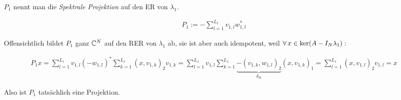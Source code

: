 \begin{remark}
    
    $P_1$ nennt man die \textit{Spektrale Projektion} auf den ER von $\lambda_1$.

    \begin{align*}
        P_1
        :=
        -\sum_{l=1}^{L_1}
            v_{1, l} w_{1, l}^\ast
    \end{align*}

    Offensichtlich bildet $P_1$ ganz $\mathbb{C}^N$ auf den RER von $\lambda_1$ ab, sie ist aber auch idempotent, weil $\forall \, x \in \operatorname{ker}(A - I_N \lambda_1):$

    \begin{align*}
        P_1 x
        =
        \sum_{l=1}^{L_1}
            v_{1, l}
            (-w_{1, l})^\ast
            \sum_{k=1}^{L_1}
                (x, v_{1, k})_2
                v_{1, k}
        =
        \sum_{l=1}^{L_1}
            v_{1, l}
            \sum_{k=1}^{L_1}
                \underbrace{-(v_{1, k}, w_{1, l})_2}_{\delta_{l k}}
                (x, v_{1, k})_1
        =
        \sum_{l=1}^{L_1}
            (x, v_{1, l})_2
            v_{1, l}
        =
        x
    \end{align*}

    Also ist $P_1$ tatsächlich eine Projektion.

\end{remark}

